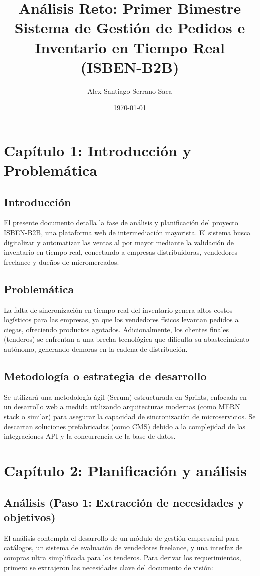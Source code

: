 \documentclass[12pt,a4paper]{article}
\title{\textbf{Análisis Reto: Primer Bimestre} \\ Sistema de Gestión de Pedidos e Inventario en Tiempo Real (ISBEN-B2B)}
\author{Alex Santiago Serrano Saca}
\date{\today}
\begin{document}
\maketitle
\tableofcontents
\newpage

\section{Capítulo 1: Introducción y Problemática}

\subsection{Introducción}
El presente documento detalla la fase de análisis y planificación del proyecto ISBEN-B2B, una plataforma web de intermediación mayorista. El sistema busca digitalizar y automatizar las ventas al por mayor mediante la validación de inventario en tiempo real, conectando a empresas distribuidoras, vendedores freelance y dueños de micromercados.

\subsection{Problemática}
La falta de sincronización en tiempo real del inventario genera altos costos logísticos para las empresas, ya que los vendedores físicos levantan pedidos a ciegas, ofreciendo productos agotados. Adicionalmente, los clientes finales (tenderos) se enfrentan a una brecha tecnológica que dificulta su abastecimiento autónomo, generando demoras en la cadena de distribución.

\subsection{Metodología o estrategia de desarrollo}
Se utilizará una metodología ágil (Scrum) estructurada en Sprints, enfocada en un desarrollo web a medida utilizando arquitecturas modernas (como MERN stack o similar) para asegurar la capacidad de sincronización de microservicios. Se descartan soluciones prefabricadas (como CMS) debido a la complejidad de las integraciones API y la concurrencia de la base de datos.

\section{Capítulo 2: Planificación y análisis}

\subsection{Análisis (Paso 1: Extracción de necesidades y objetivos)}
El análisis contempla el desarrollo de un módulo de gestión empresarial para catálogos, un sistema de evaluación de vendedores freelance, y una interfaz de compras ultra simplificada para los tenderos. Para derivar los requerimientos, primero se extrajeron las necesidades clave del documento de visión:
\end{document}
